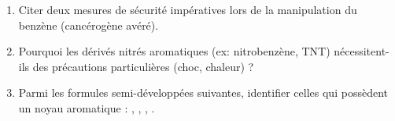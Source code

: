 \documentclass[11pt]{article}
\begin{document}
\begin{exercice}
\begin{enumerate}
    \item Citer deux mesures de sécurité impératives lors de la manipulation du benzène (cancérogène avéré).
    \item Pourquoi les dérivés nitrés aromatiques (ex: nitrobenzène, TNT) nécessitent-ils des précautions particulières (choc, chaleur) ?
    \item Parmi les formules semi-développées suivantes, identifier celles qui possèdent un noyau aromatique :
    , , , .
\end{enumerate}
\end{exercice}
\end{document}
